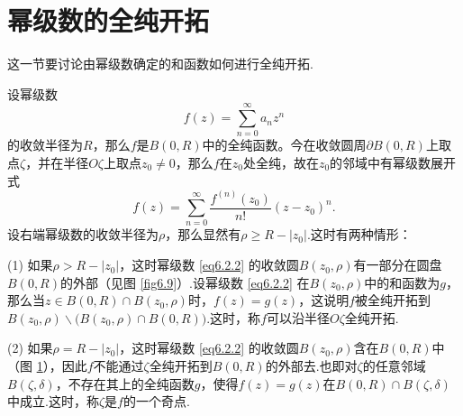 \section{幂级数的全纯开拓\label{sec6.2}}
这一节要讨论由幂级数确定的和函数如何进行全纯开拓.

设幂级数
\begin{equation}\label{eq6.2.1}
f(z)=\sum_{n=0}^\infty a_nz^n
\end{equation}
的收敛半径为$R$，那么$f$是$B(0,R)$中的全纯函数。今在收敛圆周$\partial B(0,R)$上取点$\zeta$，并在半径$O\zeta$上取点$z_0\ne0$，那么$f$在$z_0$处全纯，故在$z_0$的邻域中有幂级数展开式
\begin{equation}\label{eq6.2.2}
f(z)=\sum_{n=0}^\infty\frac{f^{(n)}(z_0)}{n!}(z-z_0)^n.
\end{equation}
设右端幂级数的收敛半径为$\rho$，那么显然有$\rho\ge R-|z_0|$.这时有两种情形：

(1) 如果$\rho>R-|z_0|$，这时幂级数 \eqref{eq6.2.2} 的收敛圆$B(z_0,\rho)$有一部分在圆盘$B(0,R)$的外部（见图 \ref{fig6.9}）.设幂级数 \eqref{eq6.2.2} 在$B(z_0,\rho)$中的和函数为$g$，那么当$z\in B(0,R)\cap B(z_0,\rho)$时，$f(z)=g(z)$，这说明$f$被全纯开拓到$B(z_0,\rho)\backslash\big(B(z_0,\rho)\cap B(0,R)\big)$.这时，称$f$可以沿半径$O\zeta$全纯开拓.
\begin{figure}[!ht]
\centering
\begin{minipage}{0.48\linewidth}
\centering
{}
\caption{\label{fig6.9}}
\end{minipage}\hfill
\begin{minipage}{0.48\linewidth}
\centering
{}
\caption{\label{fig6.10}}
\end{minipage}
\end{figure}

(2) 如果$\rho=R-|z_0|$，这时幂级数 \eqref{eq6.2.2} 的收敛圆$B(z_0,\rho)$含在$B(0,R)$中（图 \ref{fig6.10}），因此$f$不能通过$\zeta$全纯开拓到$B(0,R)$的外部去.也即对$\zeta$的任意邻域$B(\zeta,\delta)$，不存在其上的全纯函数$g$，使得$f(z)=g(z)$在$B(0,R)\cap B(\zeta,\delta)$中成立.这时，称$\zeta$是$f$的一个奇点.

